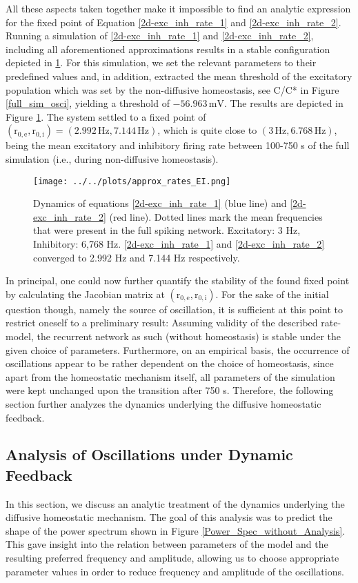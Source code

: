 \documentclass[10pt,a4paper]{article}
\begin{document}
All these aspects taken together make it impossible to find an analytic expression for the fixed point of Equation \ref{2d-exc_inh_rate_1} and \ref{2d-exc_inh_rate_2}. Running a simulation of \ref{2d-exc_inh_rate_1} and \ref{2d-exc_inh_rate_2}, including all aforementioned approximations results in a stable configuration depicted in \ref{Dyn_Rate_Approx}. For this simulation, we set the relevant parameters to their predefined values and, in addition, extracted the mean threshold of the excitatory population which was set by the non-diffusive homeostasis, see C/C* in Figure \ref{full_sim_osci}, yielding a threshold of $\mathrm{-56.963\, mV}$. The results are depicted in Figure \ref{Dyn_Rate_Approx}. The system settled to a fixed point of $\mathrm{(r_{0,e},r_{0,i}) = (2.992\, Hz, 7.144\, Hz)}$, which is quite close to $\mathrm{(3\, Hz, 6.768\, Hz)}$, being the mean excitatory and inhibitory firing rate between 100-750 s of the full simulation (i.e., during non-diffusive homeostasis).
\begin{figure}
\begin{center}
\texttt{[image: ../../plots/approx\_rates\_EI.png]}
\end{center}
\caption{Dynamics of equations \ref{2d-exc_inh_rate_1} (blue line) and \ref{2d-exc_inh_rate_2} (red line). Dotted lines mark the mean frequencies that were present in the full spiking network. Excitatory: 3 Hz, Inhibitory: 6,768 Hz. \ref{2d-exc_inh_rate_1} and \ref{2d-exc_inh_rate_2} converged to 2.992 Hz and 7.144 Hz respectively.}
\label{Dyn_Rate_Approx}
\end{figure}
In principal, one could now further quantify the stability of the found fixed point by calculating the Jacobian matrix at $\mathrm{(r_{0,e},r_{0,i})}$. For the sake of the initial question though, namely the source of oscillation, it is sufficient at this point to restrict oneself to a preliminary result: Assuming validity of the described rate-model, the recurrent network as such (without homeostasis) is stable under the given choice of parameters. Furthermore, on an empirical basis, the occurrence of oscillations appear to be rather dependent on the choice of homeostasis, since apart from the homeostatic mechanism itself, all parameters of the simulation were kept unchanged upon the transition after 750 s. Therefore, the following section further analyzes the dynamics underlying the diffusive homeostatic feedback.

\subsection{Analysis of Oscillations under Dynamic Feedback}\label{theor_osc}
In this section, we discuss an analytic treatment of the dynamics underlying the diffusive homeostatic mechanism. The goal of this analysis was to predict the shape of the power spectrum shown in Figure \ref{Power_Spec_without_Analysis}. This gave insight into the relation between parameters of the model and the resulting preferred frequency and amplitude, allowing us to choose appropriate parameter values in order to reduce frequency and amplitude of the oscillations.
\end{document}
